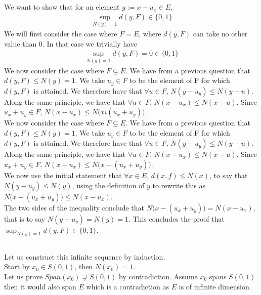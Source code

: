 \documentclass{article}
\begin{document}
\subsection{} %
We want to show that for an element $y:=x-u_x \in E$, 
\begin{align*}
	\sup _{N(y) = 1} d(y,F) \in \{ 0,1\}
\end{align*}
We will first consider the case where $F = E$, where $d(y,F)$ can take no other value than 0. In that case we trivially have
\begin{align*}
	\sup _{N(y) = 1} d(y,F) = 0 \in \{ 0,1\}
\end{align*}
We now consider the case where $F \subsetneq E$. We have from a previous question that $d(y,F) \leq N(y) = 1$. We take $u_y \in F$ to be the element of F for which $d(y,F)$ is attained. We therefore have that $\forall u \in F, \, N(y - u_y) \leq N(y - u)$. Along the same principle, we have that $\forall u \in F, \, N(x - u_x) \leq N(x - u)$. Since $u_x + u_y \in F$, $N(x - u_x) \leq N\big( x i (u_x + u_y)\big)$.\\
We now consider the case where $F \subsetneq E$. We have from a previous question that $d(y,F) \leq N(y) = 1$. We take $u_y \in F$ to be the element of F for which $d(y,F)$ is attained. We therefore have that $\forall u \in F, \, N(y - u_y) \leq N(y - u)$. Along the same principle, we have that $\forall u \in F, \, N(x - u_x) \leq N(x - u)$. Since $u_x + u_y \in F$, $N(x - u_x) \leq N\big( x - (u_x + u_y)\big)$.\\
\noindent We now use the initial statement that $\forall x \in E, \, d(x,f) \leq N(x)$, to say that $N(y- u_y) \leq N(y)$, using the definition of $y$ to rewrite this as $N\big( x - (u_x + u_y)\big) \leq N(x - u_x)$.\\
\noindent The two sides of the inequality conclude that $N\big( x - (u_x + u_y)\big) = N(x - u_x)$, that is to say $N(y- u_y) = N(y) = 1$. This concludes the proof that $\sup _{N(y) = 1} d(y,F) \in \{ 0,1\}$.

\subsection{} %

Let us construct this infinite sequence by induction. \\

\noindent Start by $x_0 \in S(0,1)$, then $N(x_0)=1$. \\
Let us prove $Span(x_0) \supsetneq S(0,1)$ by contradiction. Assume $x_0$ spans $S(0,1)$ then it would also span $E$ which is a contradiction as $E$ is of infinite dimension. \\
\end{document}
